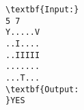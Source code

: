 \begin{verbatim}
\textbf{Input:}
5 7
Y.....V
..I....
..IIIII
.......
...T...
\textbf{Output:
}YES\end{verbatim}